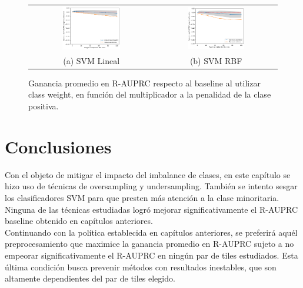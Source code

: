 \begin{figure}[h!]
\begin{tabular}{cc}
  \includegraphics[width=0.49\textwidth]{Kap7/cw/linearBEST.png} &   \includegraphics[width=0.49\textwidth]{Kap7/cw/rbfBEST.png} \\
(a) SVM Lineal& (b) SVM RBF
\end{tabular}
\caption{ Ganancia promedio en R-AUPRC respecto al baseline al utilizar class weight, en función del multiplicador a la penalidad de la clase positiva.  }
\label{fig:overall_cw}
\end{figure}

\section{Conclusiones}
\label{conclusion_imb}

Con el objeto de mitigar el impacto del imbalance de clases, en este capítulo se hizo uso de técnicas de oversampling y undersampling. También se intento sesgar los clasificadores SVM para que presten más atención a la clase minoritaria. Ninguna de las técnicas estudiadas logró mejorar significativamente el R-AUPRC baseline obtenido en capítulos anteriores. \\

Continuando con la política establecida en capítulos anteriores, se preferirá aquél preprocesamiento que maximice la ganancia promedio en R-AUPRC sujeto a no empeorar significativamente el R-AUPRC en ningún par de tiles estudiados. Esta última condición busca prevenir métodos con resultados inestables, que son altamente dependientes del par de tiles elegido. \\

